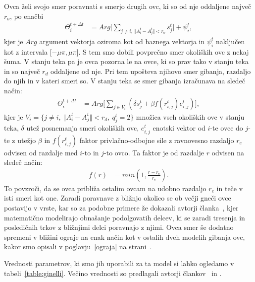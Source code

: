 Ovca želi svojo smer poravnati s smerjo drugih ovc, ki so od nje oddaljene največ $r_o$, po enačbi
\begin{align}
\Theta_i^{t+\Delta t} &= Arg\lbrack\sum_{j\not=i,~\Vert A_i^t - A_j^t\Vert < r_o}s_j^t\rbrack+\psi_i^t, \label{eq:ginelli-hoja}
\end{align}
kjer je $Arg$ argument vektorja oziroma kot od baznega vektorja in $\psi_i^t$ naključen kot z intervala $\lbrack-\mu\pi,\mu\pi\rbrack$. S tem smo dobili povprečno smer okoliških ovc z nekaj šuma. V stanju teka pa je ovca pozorna le na ovce, ki so prav tako v stanju teka in so največ $r_d$ oddaljene od nje. Pri tem upošteva njihovo smer gibanja, razdaljo do njih in v kateri smeri so. V stanju teka se smer gibanja izračunava na sledeč način:
\begin{align}
\Theta_i^{t+\Delta t} &= Arg\lbrack\sum_{j\in V_i}(\delta s_j^t+\beta f(r_{i,j}^t)e_{i,j}^t)\rbrack, \label{eq:ginelli-tek}
\end{align}
kjer je $V_i = \lbrace j\not=i,~\Vert A_i^t - A_j^t\Vert < r_d,~q_j^t=2\rbrace$ množica vseh okoliških ovc v stanju teka, $\delta$ utež posnemanja smeri okoliških ovc, $e_{i,j}^t$ enotski vektor od $i$-te ovce do $j$-te z utežjo $\beta$ in $f(r_{i,j}^t)$ faktor privlačno-odbojne sile z ravnovesno razdaljo $r_e$ odvisen od razdalje med $i$-to in $j$-to ovco. Ta faktor je od razdalje $r$ odvisen na sledeč način:
\begin{align}
f(r) &= min(1, \frac{r-r_e}{r_e}). \label{eq:ginelli-faktor}
\end{align}
To povzroči, da se ovca približa ostalim ovcam na udobno razdaljo $r_e$ in teče v isti smeri kot one. Zaradi poravnave z bližnjo okolico se ob večji gneči ovce postavijo v vrste, kar so za podobne primere že dokazali avtorji članka~\cite{degond2015continuum}, kjer matematično modelirajo obnašanje podolgovatih delcev, ki se zaradi tresenja in posledičnih trkov z bližnjimi delci poravnajo z njimi. Ovca smer še dodatno spremeni v bližini ograje na enak način kot v ostalih dveh modelih gibanja ovc, kakor smo opisali v poglavju~\ref{ograja} na strani~\pageref{ograja}.

Vrednosti parametrov, ki smo jih uporabili za ta model si lahko ogledamo v tabeli~\ref{table:ginelli}. Večino vrednosti so predlagali avtorji člankov~\cite{Ginelli} in \cite{Demsar}.

